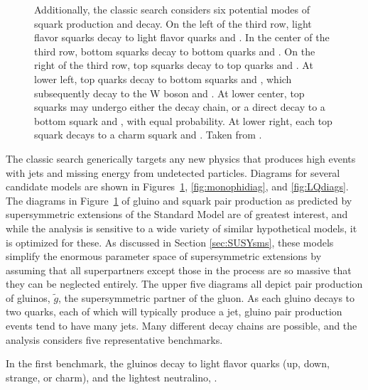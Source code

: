 \begin{figure}[h!]
{Additionally, the classic search considers six potential modes of squark production and decay.
On the left of the third row, light flavor squarks decay to light flavor quarks and \lsp.
In the center of the third row, bottom squarks decay to bottom quarks and \lsp.
On the right of the third row, top squarks decay to top quarks and \lsp.
At lower left, top quarks decay to bottom squarks and \chargino, which subsequently decay to the W boson and \lsp.
At lower center, top squarks may undergo either the \chargino decay chain, or a direct decay to a bottom squark and \lsp, with equal probability.
At lower right, each top squark decays to a charm squark and \lsp.
Taken from \cite{MT2_2019}.}
    \label{fig:susyproduction}
  \end{figure}  

    The classic search generically targets any new physics that produces high \Ht events with jets and missing energy from undetected particles.
    Diagrams for several candidate models are shown in Figures~\ref{fig:susyproduction}, \ref{fig:monophidiag}, and \ref{fig:LQdiags}.
    The diagrams in Figure~\ref{fig:susyproduction} of gluino and squark pair production as predicted by supersymmetric extensions of the Standard Model are of greatest interest, and while the analysis is sensitive to a wide variety of similar hypothetical models, it is optimized for these.
    As discussed in Section \ref{sec:SUSYsms}, these models simplify the enormous parameter space of supersymmetric extensions by assuming that all superpartners except those in the process are so massive that they can be neglected entirely.
    The upper five diagrams all depict pair production of gluinos, $\tilde{g}$, the supersymmetric partner of the gluon.
    As each gluino decays to two quarks, each of which will typically produce a jet, gluino pair production events tend to have many jets.
    Many different decay chains are possible, and the analysis considers five representative benchmarks.

    In the first benchmark, the gluinos decay to light flavor quarks (up, down, strange, or charm), and the lightest neutralino, \lsp.

